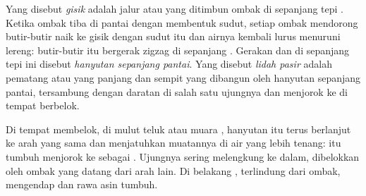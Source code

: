 \begin{definition}\label{def:g9:landforms:beach}
Yang disebut \emph{gisik} adalah jalur  atau  yang
ditimbun ombak di sepanjang tepi . Ketika ombak tiba di pantai dengan
membentuk sudut, setiap ombak mendorong butir-butir naik ke gisik dengan
sudut itu dan airnya kembali lurus menuruni lereng: butir-butir itu
bergerak zigzag di sepanjang . Gerakan  dan  di
sepanjang tepi  ini disebut \emph{hanyutan sepanjang
pantai}. Yang disebut \emph{lidah
pasir} adalah pematang  atau  yang panjang
dan sempit yang dibangun oleh hanyutan sepanjang pantai, tersambung dengan
daratan di salah satu ujungnya dan menjorok ke  di tempat 
berbelok.
\end{definition}

Di tempat  membelok, di mulut teluk atau muara , hanyutan itu
terus berlanjut ke arah yang sama dan menjatuhkan muatannya di air yang
lebih tenang:  itu tumbuh menjorok ke  sebagai .
Ujungnya sering melengkung ke dalam, dibelokkan oleh ombak yang datang
dari arah lain. Di belakang , terlindung dari ombak, 
mengendap dan rawa asin tumbuh.

